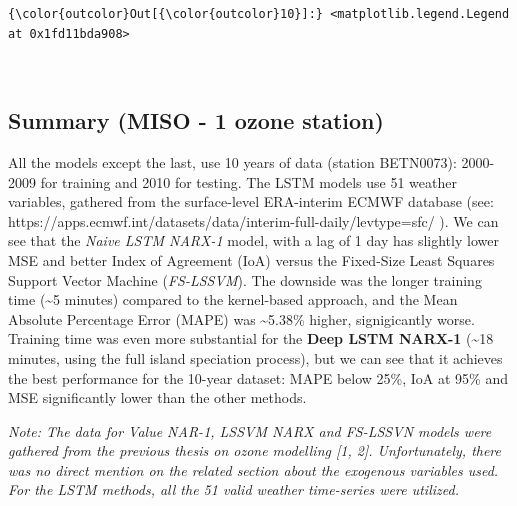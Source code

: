 \documentclass[11pt]{article}
\begin{document}
\begin{Verbatim}[commandchars=\\\{\}]
{\color{outcolor}Out[{\color{outcolor}10}]:} <matplotlib.legend.Legend at 0x1fd11bda908>
\end{Verbatim}
            
    \begin{center}
    \end{center}
    { \hspace*{\fill} \\}
    
    \hypertarget{summary-miso---1-ozone-station}{%
\subsection{Summary (MISO - 1 ozone
station)}\label{summary-miso---1-ozone-station}}

All the models except the last, use 10 years of data (station BETN0073):
2000-2009 for training and 2010 for testing. The LSTM models use 51
weather variables, gathered from the surface-level ERA-interim ECMWF
database (see:
https://apps.ecmwf.int/datasets/data/interim-full-daily/levtype=sfc/ ).
We can see that the \emph{Naive LSTM NARX-1} model, with a lag of 1 day
has slightly lower MSE and better Index of Agreement (IoA) versus the
Fixed-Size Least Squares Support Vector Machine (\emph{FS-LSSVM}). The
downside was the longer training time (\textasciitilde{}5 minutes)
compared to the kernel-based approach, and the Mean Absolute Percentage
Error (MAPE) was \textasciitilde{}5.38\% higher, signigicantly worse.
Training time was even more substantial for the \textbf{Deep LSTM
NARX-1} (\textasciitilde{}18 minutes, using the full island speciation
process), but we can see that it achieves the best performance for the
10-year dataset: MAPE below 25\%, IoA at 95\% and MSE significantly
lower than the other methods.

\emph{Note: The data for Value NAR-1, LSSVM NARX and FS-LSSVN models
were gathered from the previous thesis on ozone modelling {[}1, 2{]}.
Unfortunately, there was no direct mention on the related section about
the exogenous variables used. For the LSTM methods, all the 51 valid
weather time-series were utilized.}
\end{document}

